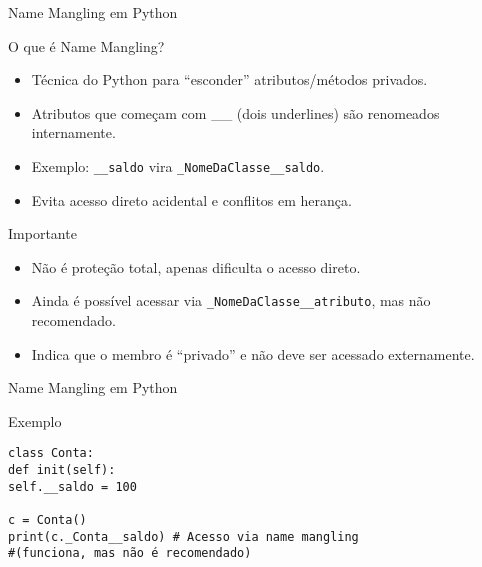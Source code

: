 \begin{frame}[fragile]{Name Mangling em Python}

    \begin{block}{O que é Name Mangling?}
        \begin{itemize}
            \item Técnica do Python para “esconder” atributos/métodos privados.
            \item Atributos que começam com \_\_ (dois underlines) são renomeados internamente.
            \item Exemplo: \texttt{\_\_saldo} vira \texttt{\_NomeDaClasse\_\_saldo}.
            \item Evita acesso direto acidental e conflitos em herança.
        \end{itemize}
    \end{block}

    \begin{block}{Importante}
        \begin{itemize}
            \item Não é proteção total, apenas dificulta o acesso direto.
            \item Ainda é possível acessar via \texttt{\_NomeDaClasse\_\_atributo}, mas não recomendado.
            \item Indica que o membro é “privado” e não deve ser acessado externamente.
        \end{itemize}
    \end{block}
\end{frame}


\begin{frame}[fragile]{Name Mangling em Python}
    \begin{exampleblock}{Exemplo}
        \begin{verbatim}
class Conta:
def init(self):
self.__saldo = 100

c = Conta()
print(c._Conta__saldo) # Acesso via name mangling 
#(funciona, mas não é recomendado)
\end{verbatim}
    \end{exampleblock}

\end{frame}


